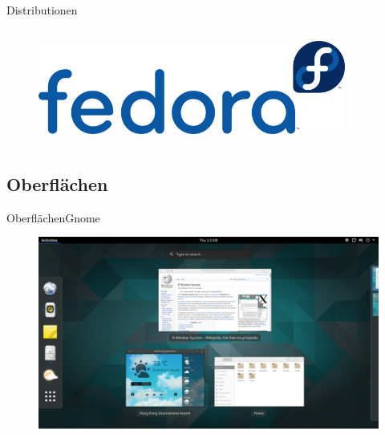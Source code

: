 \begin{frame}{Distributionen}
\begin{columns}
\begin{column}{0.5\textwidth}
	\begin{figure}
		\includegraphics[width=0.9\textwidth]{resources/640px-Fedora_logo_and_wordmark}
	\end{figure}
	
\end{column}
\end{columns}
\end{frame}

\subsection{Oberflächen}
\begin{frame}{Oberflächen}{Gnome}
\begin{figure}
\includegraphics[height=0.6\textheight]{resources/1200px-GNOME_Shell.png}
\end{figure}

\end{frame}

